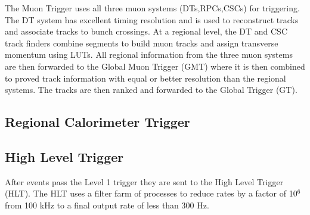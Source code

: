 The Muon Trigger uses all three muon systems (DTs,RPCs,CSCs) for triggering.
The DT system has excellent timing resolution and is used to reconstruct tracks
and associate tracks to bunch crossings. At a regional level, the DT and CSC track finders
combine segments to build muon tracks and assign transverse momentum using
LUTs. All regional information from the three muon systems are then forwarded
to the Global Muon Trigger (GMT) where it is then combined to proved track
information with equal or better resolution than the regional systems. The tracks
are then ranked and forwarded to the Global Trigger (GT).
  \subsection{Regional Calorimeter Trigger}
  \subsection{High Level Trigger}
After events pass the Level 1 trigger they are sent to the High Level Trigger (HLT). The
HLT uses a filter farm of processes to reduce rates by a factor of 10$^{6}$ from 
100 kHz to a final output rate of less than 300 Hz. 